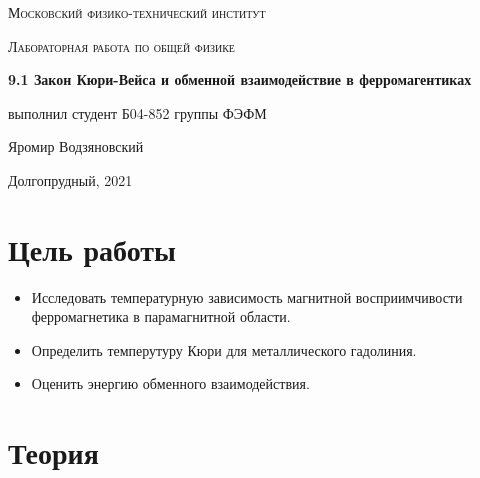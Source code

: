 \documentclass[a4paper]{article}
\begin{document}
\graphicspath{ {pictures/} }

\begin{titlepage}
	\centering
	\vspace{5cm}
    {\scshape\LARGE Московский физико-технический институт\par}
	\vspace{5cm}
	{\scshape\Large Лабораторная работа по общей физике \par}
	\vspace{1cm}
    {\huge\bfseries  9.1 Закон Кюри-Вейса и обменной взаимодействие в ферромагентиках \par}
	\vspace{1cm}
	\vfill
    \begin{flushright}
        {\large выполнил студент Б04-852 группы ФЭФМ}\par
        \vspace{0.3cm}
        {\LARGE Яромир Водзяновский}
    \end{flushright}
	\vfill
Долгопрудный, 2021
\end{titlepage}

\pagestyle{fancy} 
\fancyhead[C]{}
\fancyfoot[C]{ \noindent\rule{\textwidth}{0.4pt} \thepage }

\tableofcontents

\newpage



\section{Цель работы}

\begin{itemize}
    
    \item Исследовать температурную зависимость магнитной восприимчивости ферромагнетика в парамагнитной области.
    \item Определить темперутуру Кюри для металлического гадолиния.
    \item Оценить энергию обменного взаимодействия.
\end{itemize}



\section{Теория}
\end{document}
